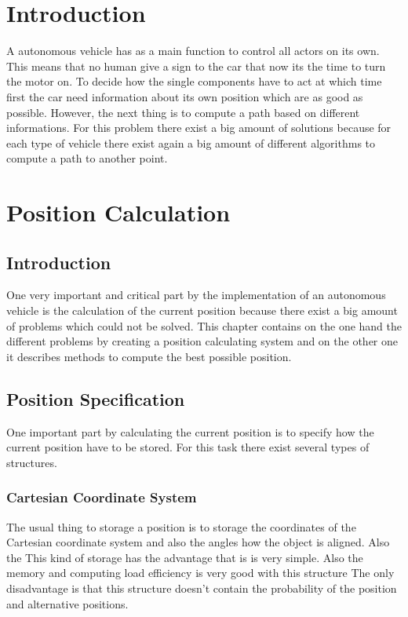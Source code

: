 \section{Introduction}
A autonomous vehicle has as a main function to control all actors on its own.
This means that no human give a sign to the car that now its the time to turn the motor on.
To decide how the single components have to act at which time first the car need information about its own position which are as good as possible.
However, the next thing is to compute a path based on different informations.
For this problem there exist a big amount of solutions because for each type of vehicle there exist again a big amount of different algorithms to compute a path to another point.

\section{Position Calculation}


\subsection{Introduction}
One very important and critical part by the implementation of an autonomous vehicle is the calculation of the current position because there exist a big amount of problems which could not be solved.
This chapter contains on the one hand the different problems by creating a position calculating system and on the other one it describes methods to compute the best possible position.


\subsection{Position Specification}
One important part by calculating the current position is to specify how the current position have to be stored.
For this task there exist several types of structures.


\subsubsection{Cartesian Coordinate System}
The usual thing to storage a position is to storage the coordinates of the Cartesian coordinate system and also the angles how the object is aligned.
Also the 
This kind of storage has the advantage that is is very simple.
Also the memory and computing load efficiency is very good with this structure
The only disadvantage is that this structure doesn't contain the probability of the position and alternative positions.


